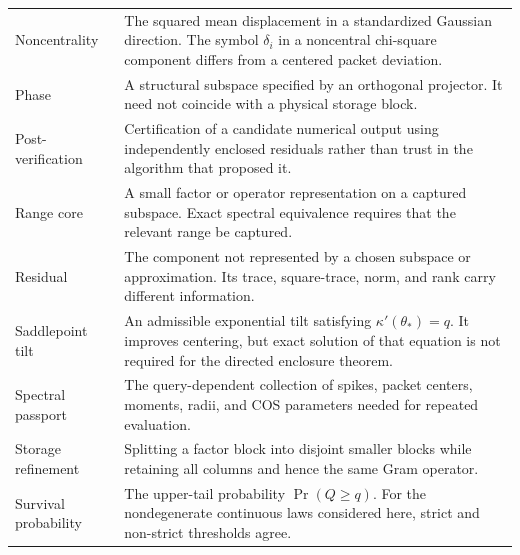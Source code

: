 \begin{longtable}{@{}P{.25\linewidth}P{.70\linewidth}@{}}
Noncentrality & The squared mean displacement in a standardized Gaussian direction. The symbol $\delta_i$ in a noncentral chi-square component differs from a centered packet deviation.\\
Phase & A structural subspace specified by an orthogonal projector. It need not coincide with a physical storage block.\\
Post-verification & Certification of a candidate numerical output using independently enclosed residuals rather than trust in the algorithm that proposed it.\\
Range core & A small factor or operator representation on a captured subspace. Exact spectral equivalence requires that the relevant range be captured.\\
Residual & The component not represented by a chosen subspace or approximation. Its trace, square-trace, norm, and rank carry different information.\\
Saddlepoint tilt & An admissible exponential tilt satisfying $\kappa'(\theta_*)=q$. It improves centering, but exact solution of that equation is not required for the directed enclosure theorem.\\
Spectral passport & The query-dependent collection of spikes, packet centers, moments, radii, and COS parameters needed for repeated evaluation.\\
Storage refinement & Splitting a factor block into disjoint smaller blocks while retaining all columns and hence the same Gram operator.\\
Survival probability & The upper-tail probability $\Pr(Q\ge q)$. For the nondegenerate continuous laws considered here, strict and non-strict thresholds agree.\\
\bottomrule
\end{longtable}


